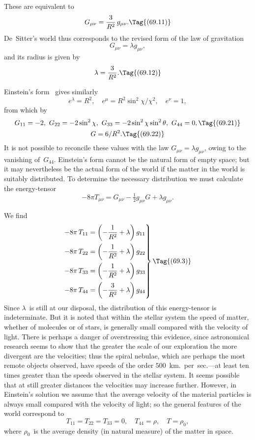 \documentclass[12pt]{book}
\begin{document}
These are equivalent to
\[
G_{\mu\nu} = \frac{3}{R^{2}}\, g_{\mu\nu}.
\Tag{(69.11)}
\]
De~Sitter's world thus corresponds to the revised form of the law of gravitation
\[
G_{\mu\nu} = \lambda g_{\mu\nu},
\]
and its radius is given by
\[
\lambda = \frac{3}{R^{2}}.
\Tag{(69.12)}
\]

Einstein's form~ gives similarly
\[
e^{\lambda} = R^{2},\quad
e^{\mu} = R^{2}\sin^{2}\chi/\chi^{2},\quad
e^{\nu} = 1,
\]
from which by~
\begin{gather*}
  G_{11} = -2,\
  G_{22} = -2\sin^{2}\chi,\
  G_{33} = -2\sin^{2}\chi \sin^{2}\theta,\
  G_{44} = 0,
  \Tag{(69.21)} \\
  G = 6/R^{2}.
  \Tag{(69.22)}
\end{gather*}
It is not possible to reconcile these values with the law $G_{\mu\nu} = \lambda g_{\mu\nu}$, owing to
the vanishing of~$G_{44}$. Einstein's form cannot be the natural form of empty
space; but it may nevertheless be the actual form of the world if the matter
in the world is suitably distributed. To determine the necessary distribution
we must calculate the energy\hyp{}tensor~\Eq{(54.71)}
\[
-8\pi T_{\mu\nu} = G_{\mu\nu} - \tfrac{1}{2}g_{\mu\nu}G + \lambda g_{\mu\nu}.
\]

We find
\[
\left.
\begin{aligned}
  - 8\pi\, T_{11} &= \left(-\frac{1}{R^{2}} + \lambda\right) g_{11}\\
  - 8\pi\, T_{22} &= \left(-\frac{1}{R^{2}} + \lambda\right) g_{22}\\
  - 8\pi\, T_{33} &= \left(-\frac{1}{R^{2}} + \lambda\right) g_{33}\\
  - 8\pi\, T_{44} &= \left(-\frac{3}{R^{2}} + \lambda\right) g_{44}
\end{aligned}
\right\}
\Tag{(69.3)}
\]
Since $\lambda$~is still at our disposal, the distribution of this energy\hyp{}tensor is indeterminate.
But it is noted that within the stellar system the speed of matter,
whether of molecules or of stars, is generally small compared with the velocity
of light. There is perhaps a danger of overstressing this evidence, since astronomical
research seems to show that the greater the scale of our exploration
the more divergent are the velocities; thus the spiral nebulae, which are
perhaps the most remote objects observed, have speeds of the order $500$~km.\
per~sec.---at least ten times greater than the speeds observed in the stellar
system. It seems possible that at still greater distances the velocities may
increase further. However, in Einstein's solution we assume that the average
velocity of the material particles is always small compared with the velocity
of light; so the general features of the world correspond to
\index{World!mass of}%
\[
T_{11} = T_{22} = T_{33} = 0,\quad
T_{44} = \rho,\quad
T = \rho_{0},
\]
where $\rho_{0}$~is the average density (in natural measure) of the matter in space.
\end{document}
